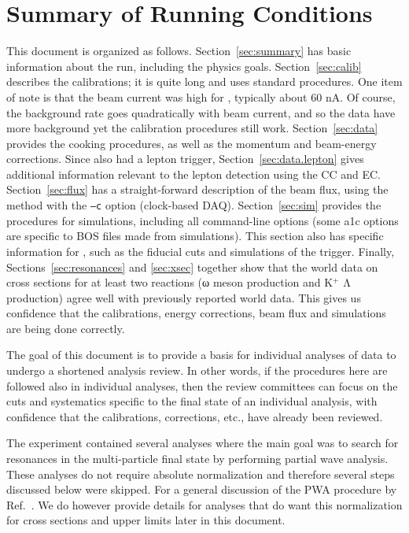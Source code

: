 \section{\label{sec:summary}Summary of Running Conditions}

This document is organized as follows. Section~\ref{sec:summary} has basic information about the  run, including the physics goals. Section~\ref{sec:calib} describes the calibrations; it is quite long and uses standard  procedures. One item of note is that the beam current was high for , typically about 60 nA. Of course, the background rate goes quadratically with beam current, and so the  data have more background yet the calibration procedures still work. Section~\ref{sec:data} provides the cooking procedures, as well as the momentum and beam-energy corrections. Since  also had a lepton trigger, Section~\ref{sec:data.lepton} gives additional information relevant to the lepton detection using the CC and EC. Section~\ref{sec:flux} has a straight-forward description of the beam flux, using the  method with the \verb+–c+ option (clock-based DAQ). Section~\ref{sec:sim} provides the procedures for simulations, including all command-line options (some a1c options are specific to BOS files made from simulations). This section also has specific information for , such as the fiducial cuts and simulations of the  trigger. Finally, Sections~\ref{sec:resonances} and \ref{sec:xsec} together show that the world data on cross sections for at least two reactions (ω meson production and K$^+$ Λ production) agree well with previously reported world data. This gives us confidence that the calibrations, energy corrections, beam flux and simulations are being done correctly.

The goal of this document is to provide a basis for individual analyses of  data to undergo a shortened analysis review. In other words, if the procedures here are followed also in individual analyses, then the review committees can focus on the cuts and systematics specific to the final state of an individual analysis, with confidence that the calibrations, corrections, etc., have already been reviewed.

The  experiment contained several analyses where the main goal was to search for resonances in the multi-particle final state by performing partial wave analysis. These analyses\cite{clas.thesis.bookwalter, clas.thesis.schott} do not require absolute normalization and therefore several steps discussed below were skipped. For a general discussion of the PWA procedure by  Ref.~\cite{pwa.salgado2014}. We do however provide details for analyses that do want this normalization for cross sections and upper limits later in this document.

